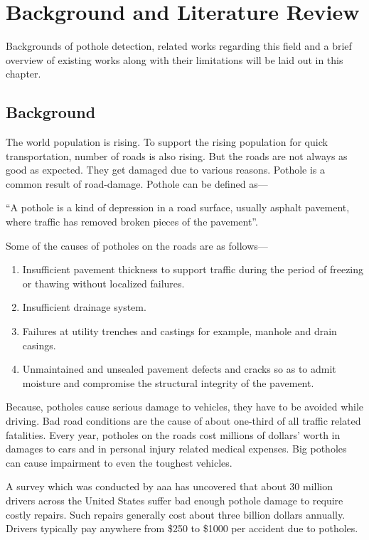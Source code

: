 \chapter{Background and Literature Review}

Backgrounds of pothole detection, related works regarding this field and a brief overview of existing works along with their limitations will be laid out in this chapter.

\section{Background}
    The world population is rising. To support the rising population for quick transportation, number of roads is also rising. But the roads are not always as good as expected. They get damaged due to various reasons. Pothole is a common result of road-damage. Pothole can be defined as---
    
    ``A pothole is a kind of depression in a road surface, usually asphalt pavement, where traffic has removed broken pieces of the pavement''\cite{wiki:potholes}.
    
    Some of the causes of potholes on the roads are as follows\cite{wiki:potholes}---
    \begin{enumerate}
        \item{Insufficient pavement thickness to support traffic during the period of freezing or thawing without localized failures.}
        \item{Insufficient drainage system.}
        \item{Failures at utility trenches and castings for example, manhole and drain casings.}
        \item{Unmaintained and unsealed pavement defects and cracks so as to admit moisture and compromise the structural integrity of the pavement.}
    \end{enumerate}
    
    \clearpage
    
    Because, potholes cause serious damage to vehicles, they have to be avoided while driving. Bad road conditions are the cause of about one-third of all traffic related fatalities. Every year, potholes on the roads cost millions of dollars’ worth in damages to cars and in personal injury related medical expenses. Big potholes can cause impairment to even the toughest vehicles\cite{romanjul19}.

    A survey which was conducted by \acrfull{aaa} has uncovered that about 30 million drivers across the United States suffer bad enough pothole damage to require costly repairs. Such repairs generally cost about three billion dollars annually. Drivers typically pay anywhere from \$250 to \$1000 per accident due to potholes\cite{romanjul19}.
    
